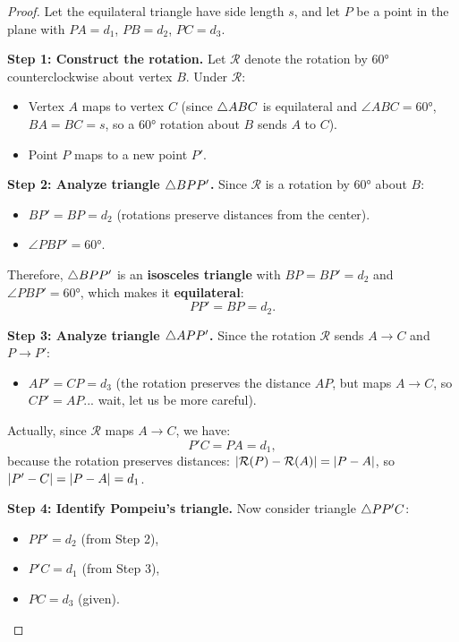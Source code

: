 \begin{proof}
Let the equilateral triangle have side length $s$, and let $P$ be a point in the plane with $PA = d_1$, $PB = d_2$, $PC = d_3$.

\textbf{Step 1: Construct the rotation.}
Let $\mathcal{R}$ denote the rotation by $60°$ counterclockwise about vertex $B$. Under $\mathcal{R}$:
\begin{itemize}
    \item Vertex $A$ maps to vertex $C$ (since $\triangle ABC$ is equilateral and $\angle ABC = 60°$, $BA = BC = s$, so a $60°$ rotation about $B$ sends $A$ to $C$).
    \item Point $P$ maps to a new point $P'$.
\end{itemize}

\textbf{Step 2: Analyze triangle $\triangle BPP'$.}
Since $\mathcal{R}$ is a rotation by $60°$ about $B$:
\begin{itemize}
    \item $BP' = BP = d_2$ (rotations preserve distances from the center).
    \item $\angle PBP' = 60°$.
\end{itemize}
Therefore, $\triangle BPP'$ is an \textbf{isosceles triangle} with $BP = BP' = d_2$ and $\angle PBP' = 60°$, which makes it \textbf{equilateral}:
\begin{equation}
PP' = BP = d_2.
\end{equation}

\textbf{Step 3: Analyze triangle $\triangle APP'$.}
Since the rotation $\mathcal{R}$ sends $A \to C$ and $P \to P'$:
\begin{itemize}
    \item $AP' = CP = d_3$ (the rotation preserves the distance $AP$, but maps $A \to C$, so $CP' = AP$... wait, let us be more careful).
\end{itemize}

Actually, since $\mathcal{R}$ maps $A \to C$, we have:
\begin{equation}
P'C = PA = d_1,
\end{equation}
because the rotation preserves distances: $\left\lvert \mathcal{R}(P) - \mathcal{R}(A) \right\rvert = \left\lvert P - A \right\rvert$, so $\left\lvert P' - C \right\rvert = \left\lvert P - A \right\rvert = d_1$.

\textbf{Step 4: Identify Pompeiu's triangle.}
Now consider triangle $\triangle PP'C$:
\begin{itemize}
    \item $PP' = d_2$ (from Step 2),
    \item $P'C = d_1$ (from Step 3),
    \item $PC = d_3$ (given).
\end{itemize}


\end{proof}
